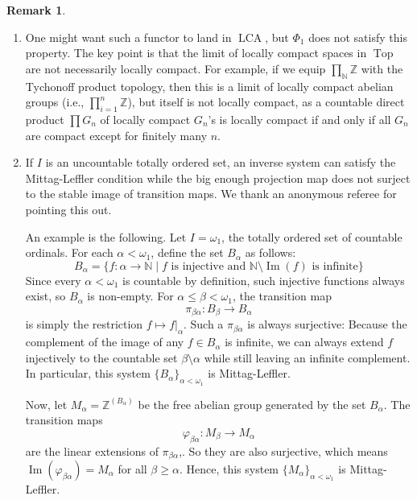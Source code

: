 \documentclass[11pt]{amsart}
\newcommand{\N}{\mathbb{N}}
\newcommand{\Z}{\mathbb{Z}}
\renewcommand{\Im}{\operatorname{Im}}
\newcommand{\Top}{\operatorname{Top}}
\newcommand{\LCA}{\operatorname{LCA}}
\renewcommand{\phi}{{\varphi}}
\theoremstyle{plain}
\theoremstyle{definition}
\newtheorem{rmk}[prop]{Remark}
\numberwithin{equation}{prop}
\begin{document}
\begin{rmk}
\begin{enumerate}
    \item 
One might want such a functor to land in $\LCA$, but  $\Phi_1$ does not satisfy this property. 
The key point is that the limit of locally compact spaces in $\Top$ are not necessarily locally compact.
For example, if we equip $\prod_\N \Z$ with the Tychonoff product topology, then this is a limit of locally compact abelian groups (i.e., $\prod^n_{i=1} \Z$), but itself is not locally compact, as a countable direct product $\prod G_n$ of locally compact $G_n$'s is locally compact if and only if  all $G_n$ are compact except for finitely many $n$.
\item 
If $I$ is an uncountable totally ordered set, an inverse system can satisfy the Mittag-Leffler condition while the big enough projection map does not surject to the stable image of transition maps. 
We thank an anonymous referee for pointing this out.

An example is the following.
Let $I = \omega_1$, the totally ordered set of countable ordinals. 
For each $\alpha < \omega_1$, define the set $B_\alpha$ as follows:
$$ B_\alpha = \{ f: \alpha \to \mathbb{N} \mid f \text{ is injective and } \mathbb{N} \setminus \Im(f) \text{ is infinite} \} $$
Since every $\alpha < \omega_1$ is countable by definition, such injective functions always exist, so $B_\alpha$ is non-empty. 
For $\alpha \le \beta < \omega_1$, the transition map 
$$\pi_{\beta\alpha}: B_\beta \to B_\alpha$$
is simply the restriction $f \mapsto f|_\alpha$.
Such a $\pi_{\beta\alpha}$ is always surjective: 
Because the complement of the image of any $f \in B_\alpha$ is infinite, 
we can always extend $f$ injectively to the countable set $\beta \setminus \alpha$ while still leaving an infinite complement. 
In particular, this system $\{B_\alpha\}_{\alpha<\omega_1}$ is Mittag-Leffler.

Now, let $M_\alpha = \mathbb{Z}^{(B_\alpha)}$ be the free abelian group generated by the set $B_\alpha$. 
The transition maps 
$$\phi_{\beta\alpha}: M_\beta \to M_\alpha$$
are the linear extensions of $\pi_{\beta\alpha}$,.
So they are also surjective, which means
$\Im(\phi_{\beta \alpha}) = M_\alpha$ for all $\beta \ge \alpha$. 
Hence, this system $\{M_\alpha\}_{\alpha<\omega_1}$ is Mittag-Leffler.


\end{enumerate}
\end{rmk}
\end{document}

